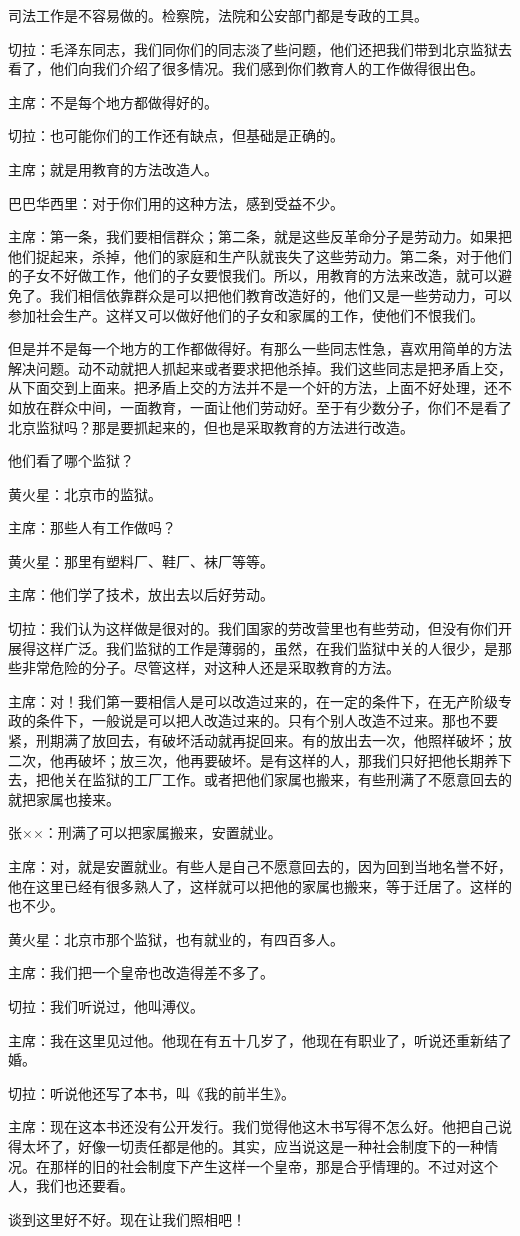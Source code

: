 司法工作是不容易做的。检察院，法院和公安部门都是专政的工具。

切拉：毛泽东同志，我们同你们的同志淡了些问题，他们还把我们带到北京监狱去看了，他们向我们介绍了很多情况。我们感到你们教育人的工作做得很出色。

主席：不是每个地方都做得好的。

切拉：也可能你们的工作还有缺点，但基础是正确的。

主席；就是用教育的方法改造人。

巴巴华西里：对于你们用的这种方法，感到受益不少。

主席：第一条，我们要相信群众；第二条，就是这些反革命分子是劳动力。如果把他们捉起来，杀掉，他们的家庭和生产队就丧失了这些劳动力。第二条，对于他们的子女不好做工作，他们的子女要恨我们。所以，用教育的方法来改造，就可以避免了。我们相信依靠群众是可以把他们教育改造好的，他们又是一些劳动力，可以参加社会生产。这样又可以做好他们的子女和家属的工作，使他们不恨我们。

但是并不是每一个地方的工作都做得好。有那么一些同志性急，喜欢用简单的方法解决问题。动不动就把人抓起来或者要求把他杀掉。我们这些同志是把矛盾上交，从下面交到上面来。把矛盾上交的方法并不是一个奸的方法，上面不好处理，还不如放在群众中间，一面教育，一面让他们劳动好。至于有少数分子，你们不是看了北京监狱吗？那是要抓起来的，但也是采取教育的方法进行改造。

他们看了哪个监狱？

黄火星：北京市的监狱。

主席：那些人有工作做吗？

黄火星：那里有塑料厂、鞋厂、袜厂等等。

主席：他们学了技术，放出去以后好劳动。

切拉：我们认为这样做是很对的。我们国家的劳改营里也有些劳动，但没有你们开展得这样广泛。我们监狱的工作是薄弱的，虽然，在我们监狱中关的人很少，是那些非常危险的分子。尽管这样，对这种人还是采取教育的方法。

主席：对！我们第一要相信人是可以改造过来的，在一定的条件下，在无产阶级专政的条件下，一般说是可以把人改造过来的。只有个别人改造不过来。那也不要紧，刑期满了放回去，有破坏活动就再捉回来。有的放出去一次，他照样破坏；放二次，他再破坏；放三次，他再要破坏。是有这样的人，那我们只好把他长期养下去，把他关在监狱的工厂工作。或者把他们家属也搬来，有些刑满了不愿意回去的就把家属也接来。

张××：刑满了可以把家属搬来，安置就业。

主席：对，就是安置就业。有些人是自己不愿意回去的，因为回到当地名誉不好，他在这里已经有很多熟人了，这样就可以把他的家属也搬来，等于迁居了。这样的也不少。

黄火星：北京市那个监狱，也有就业的，有四百多人。

主席：我们把一个皇帝也改造得差不多了。

切拉：我们听说过，他叫溥仪。

主席：我在这里见过他。他现在有五十几岁了，他现在有职业了，听说还重新结了婚。

切拉：听说他还写了本书，叫《我的前半生》。

主席：现在这本书还没有公开发行。我们觉得他这木书写得不怎么好。他把自己说得太坏了，好像一切责任都是他的。其实，应当说这是一种社会制度下的一种情况。在那样的旧的社会制度下产生这样一个皇帝，那是合乎情理的。不过对这个人，我们也还要看。

谈到这里好不好。现在让我们照相吧！


